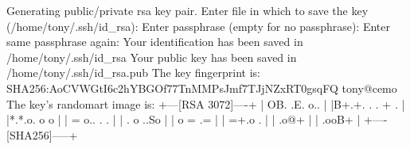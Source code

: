Generating public/private rsa key pair.
Enter file in which to save the key (/home/tony/.ssh/id_rsa): 
Enter passphrase (empty for no passphrase): 
Enter same passphrase again: 
Your identification has been saved in /home/tony/.ssh/id_rsa
Your public key has been saved in /home/tony/.ssh/id_rsa.pub
The key fingerprint is:
SHA256:AoCVWGtI6c2hYBGOf77TnMMPsJmf7TJjNZxRT0gsqFQ tony@cemo
The key's randomart image is:
+---[RSA 3072]----+
| OB. .E. o..     |
|B+.+. . . + .    |
|*.*.o.   o o     |
| = o..  .   .    |
|  . o ..So       |
|   o = .=        |
|    =+.o .       |
|    .o@+         |
|    .ooB+        |
+----[SHA256]-----+
